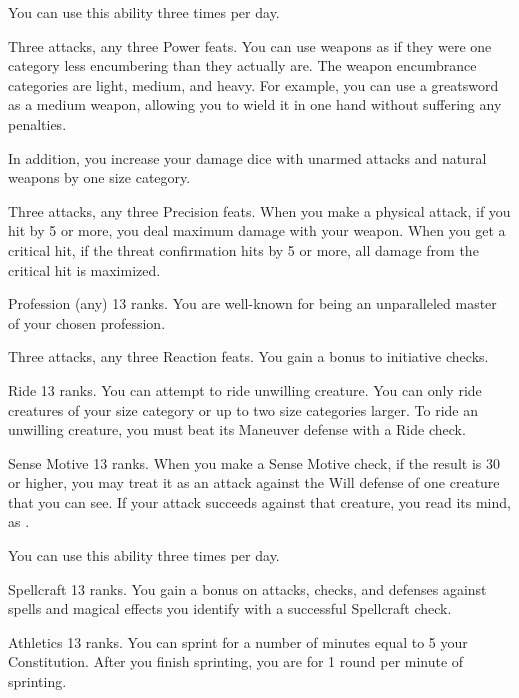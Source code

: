 You can use this ability three times per day.

\featpres Three attacks, any three Power feats.
\featben You can use weapons as if they were one category less encumbering than they actually are.
The weapon encumbrance categories are light, medium, and heavy.
For example, you can use a greatsword as a medium weapon, allowing you to wield it in one hand without suffering any penalties.

In addition, you increase your damage dice with unarmed attacks and natural weapons by one size category.

\featpres Three attacks, any three Precision feats.
\featben When you make a physical attack, if you hit by 5 or more, you deal maximum damage with your weapon.
When you get a critical hit, if the threat confirmation hits by 5 or more, all damage from the critical hit is maximized.

\featpre Profession (any) 13 ranks.
\featben You are well-known for being an unparalleled master of your chosen profession.

\featpres Three attacks, any three Reaction feats.
\featben You gain a  bonus to initiative checks.

\featpre Ride 13 ranks.
\featben You can attempt to ride unwilling creature.
You can only ride creatures of your size category or up to two size categories larger.
To ride an unwilling creature, you must beat its Maneuver defense with a Ride check.

\featpre Sense Motive 13 ranks.
\featben When you make a Sense Motive check, if the result is 30 or higher, you may treat it as an attack against the Will defense of one creature that you can see.
If your attack succeeds against that creature, you read its mind, as .

You can use this ability three times per day.

\featpre Spellcraft 13 ranks.
\featben You gain a  bonus on attacks, checks, and defenses against spells and magical effects you identify with a successful Spellcraft check.

\featpre Athletics 13 ranks.
\featben You can sprint for a number of minutes equal to 5 \add your Constitution.
After you finish sprinting, you are \fatigued for 1 round per minute of sprinting.

